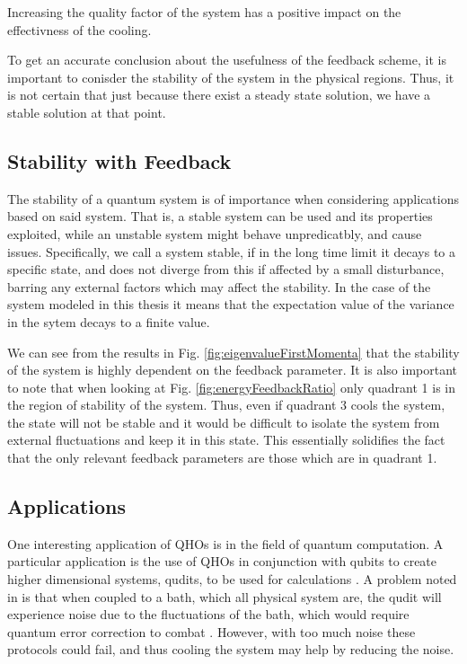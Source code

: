 Increasing the quality factor of the system has a positive impact on the effectivness of the cooling.

To get an accurate conclusion about the usefulness of the feedback scheme, it is important to conisder the stability of the system in the physical regions. Thus, it is not certain that just because there exist a steady state solution, we have a stable solution at that point.



\subsection{Stability with Feedback}
The stability of a quantum system is of importance when considering applications based on said system. That is, a stable system can be used and its properties exploited, while an unstable system might behave unpredicatbly, and cause issues. Specifically, we call a system stable, if in the long time limit it decays to a specific state, and does not diverge from this if affected by a small disturbance, barring any external factors which may affect the stability. In the case of the system modeled in this thesis it means that the expectation value of the variance in the sytem decays to a finite value.

We can see from the results in Fig. \ref{fig:eigenvalueFirstMomenta} that the stability of the system is highly dependent on the feedback parameter. It is also important to note that when looking at Fig. \ref{fig:energyFeedbackRatio} only quadrant 1 is in the region of stability of the system. Thus, even if quadrant 3 cools the system, the state will not be stable and it would be difficult to isolate the system from external fluctuations and keep it in this state. This essentially solidifies the fact that the only relevant feedback parameters are those which are in quadrant 1. 


\subsection{Applications}
One interesting application of QHOs is in the field of quantum computation. A particular application is the use of QHOs in conjunction with qubits to create higher dimensional systems, qudits, to be used for calculations \cite{Liu:2021}. A problem noted in \cite{Liu:2021} is that when coupled to a bath, which all physical system are, the qudit will experience noise due to the fluctuations of the bath, which would require quantum error correction to combat \cite{Liu:2021}. However, with too much noise these protocols could fail, and thus cooling the system may help by reducing the noise.

